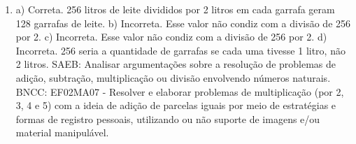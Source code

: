 \begin{enumerate}
\item
a) Correta. 256 litros de leite divididos por 2 litros em cada garrafa geram 128 garrafas de leite.
b) Incorreta. Esse valor não condiz com a divisão de 256 por 2.
c) Incorreta. Esse valor não condiz com a divisão de 256 por 2.
d) Incorreta. 256 seria a quantidade de garrafas se cada uma tivesse 1 litro, não 2 litros.
SAEB: Analisar argumentações sobre a resolução de problemas de
adição, subtração, multiplicação ou divisão envolvendo números naturais.
BNCC: EF02MA07 - Resolver e elaborar problemas de multiplicação (por 2,
3, 4 e 5) com a ideia de adição de parcelas iguais por meio de
estratégias e formas de registro pessoais, utilizando ou não suporte de
imagens e/ou material manipulável.
\end{enumerate}


